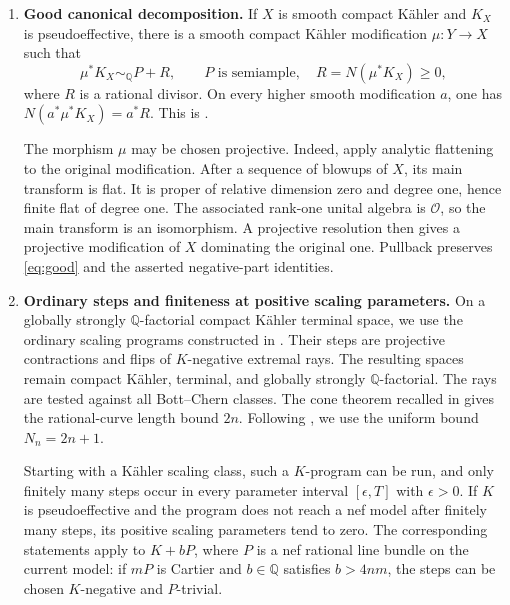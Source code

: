 \documentclass[11pt,a4paper]{article}
\theoremstyle{definition}\newtheorem{definition}[theorem]{Definition}
\theoremstyle{remark}\newtheorem*{remark}{Remark}
\newcommand{\Q}{\mathbb Q}\newcommand{\C}{\mathbb C}
\newcommand{\OO}{\mathcal O}
\begin{document}
\begin{enumerate}[label=\textbf{(B\arabic*)},leftmargin=*]
\item\label{in:decomp}
\textbf{Good canonical decomposition.}
If $X$ is smooth compact Kähler and $K_X$ is pseudoeffective, there is a
smooth compact Kähler modification $\mu:Y\to X$ such that
\begin{equation}\label{eq:good}
 \mu^*K_X\sim_\Q P+R,\qquad
 P\text{ is semiample},\quad R=N(\mu^*K_X)\ge0,
\end{equation}
where $R$ is a rational divisor. On every higher smooth modification $a$,
one has $N(a^*\mu^*K_X)=a^*R$.
This is \cite[Theorem~2.13 and Lemma~2.4]{OAI034}.

The morphism $\mu$ may be chosen projective. Indeed, apply analytic
flattening \cite{Hironaka1975} to the original modification. After a
sequence of blowups of $X$, its main transform is flat. It is proper of
relative dimension zero and degree one, hence finite flat of degree one.
The associated rank-one unital algebra is $\OO$, so the main transform
is an isomorphism. A projective resolution then gives a projective
modification of $X$ dominating the original one. Pullback preserves
\eqref{eq:good} and the asserted negative-part identities.

\item\label{in:steps}
\textbf{Ordinary steps and finiteness at positive scaling parameters.}
On a globally strongly $\Q$-factorial compact Kähler terminal space,
we use the ordinary scaling programs constructed in
\cite[Lemma~3.6]{OAI034}. Their steps are projective contractions
and flips of $K$-negative extremal rays. The resulting
spaces remain compact Kähler, terminal, and globally strongly
$\Q$-factorial. The rays are tested against all Bott--Chern classes.
The cone theorem recalled in \cite[Theorem~1.3]{HX2026} gives the
rational-curve length bound $2n$. Following
\cite[Section~3.1]{OAI034}, we use the uniform bound $N_n=2n+1$.

Starting with a Kähler scaling class, such a $K$-program can be run,
and only finitely many steps occur in every parameter interval
$[\epsilon,T]$ with $\epsilon>0$.
If $K$ is pseudoeffective and the program does not reach a nef model
after finitely many steps, its positive scaling parameters tend to zero.
The corresponding statements apply to $K+bP$, where $P$ is a nef
rational line bundle on the current model: if $mP$ is Cartier and
$b\in\Q$ satisfies $b>4nm$, the steps can be chosen
$K$-negative and $P$-trivial.


\end{enumerate}
\end{document}
